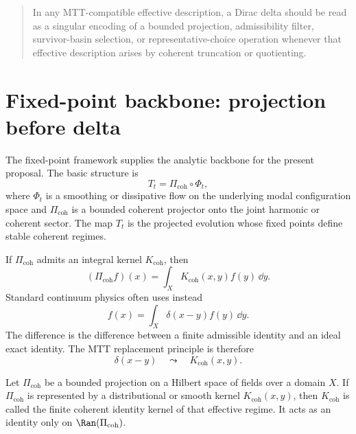 \documentclass[11pt]{article}
\begin{document}
\begin{quote}
In any MTT-compatible effective description, a Dirac delta should be read as a
singular encoding of a bounded projection, admissibility filter, survivor-basin
selection, or representative-choice operation whenever that effective description
arises by coherent truncation or quotienting.
\end{quote}

\section{Fixed-point backbone: projection before delta}

The fixed-point framework supplies the analytic backbone for the present proposal.  The
basic structure is
\begin{equation}
T_t=\Pi_{\mathrm{coh}}\circ \Phi_t,
\end{equation}
where \(\Phi_t\) is a smoothing or dissipative flow on the underlying modal configuration
space and \(\Pi_{\mathrm{coh}}\) is a bounded coherent projector onto the joint harmonic or
coherent sector.  The map \(T_t\) is the projected evolution whose fixed points define
stable coherent regimes.

If \(\Pi_{\mathrm{coh}}\) admits an integral kernel \(K_{\mathrm{coh}}\), then
\begin{equation}
(\Pi_{\mathrm{coh}}f)(x)=\int_X K_{\mathrm{coh}}(x,y)f(y)\,\dd y.
\end{equation}
Standard continuum physics often uses instead
\begin{equation}
f(x)=\int_X \delta(x-y)f(y)\,\dd y.
\end{equation}
The difference is the difference between a finite admissible identity and an ideal exact
identity.  The MTT replacement principle is therefore
\begin{equation}
\boxed{\delta(x-y)\quad\leadsto\quad K_{\mathrm{coh}}(x,y).}
\end{equation}

\begin{definition}
Let \(\Pi_{\mathrm{coh}}\) be a bounded projection on a Hilbert space of fields over a
domain \(X\).  If \(\Pi_{\mathrm{coh}}\) is represented by a distributional or smooth kernel
\(K_{\mathrm{coh}}(x,y)\), then \(K_{\mathrm{coh}}\) is called the finite coherent identity
kernel of that effective regime. It acts as an identity only on \(\Ran(\Pi_{\mathrm{coh}})\).
\end{definition}
\end{document}
